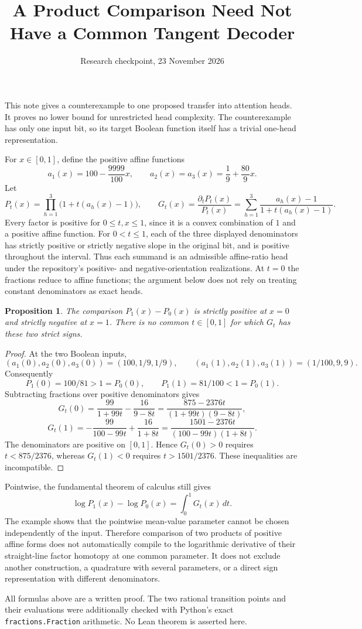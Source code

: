 \documentclass[11pt]{article}
\title{A Product Comparison Need Not Have a Common Tangent Decoder}
\author{Research checkpoint, 23 November 2026}
\date{}
\newtheorem{proposition}{Proposition}
\begin{document}
\maketitle

This note gives a counterexample to one proposed transfer into attention
heads. It proves no lower bound for unrestricted head complexity. The
counterexample has only one input bit, so its target Boolean function itself
has a trivial one-head representation.

For $x\in[0,1]$, define the positive affine functions
\[
 a_1(x)=100-\frac{9999}{100}x,
 \qquad
 a_2(x)=a_3(x)=\frac19+\frac{80}{9}x.
\]
Let
\[
 P_t(x)=\prod_{h=1}^3\bigl(1+t(a_h(x)-1)\bigr),
 \qquad
 G_t(x)=\frac{\partial_t P_t(x)}{P_t(x)}
 =\sum_{h=1}^3\frac{a_h(x)-1}{1+t(a_h(x)-1)}.
\]
Every factor is positive for $0\leq t,x\leq1$, since it is a convex
combination of $1$ and a positive affine function. For $0<t\leq1$,
each of the three displayed denominators has strictly positive or strictly
negative slope in the original bit, and is positive throughout the interval.
Thus each summand is an admissible affine-ratio head under the repository's
positive- and negative-orientation realizations. At $t=0$ the fractions
reduce to affine functions; the argument below does not rely on treating
constant denominators as exact heads.

\begin{proposition}
The comparison $P_1(x)-P_0(x)$ is strictly positive at $x=0$ and
strictly negative at $x=1$. There is no common $t\in[0,1]$ for which
$G_t$ has these two strict signs.
\end{proposition}
\begin{proof}
At the two Boolean inputs,
\[
 (a_1(0),a_2(0),a_3(0))=(100,1/9,1/9),\qquad
 (a_1(1),a_2(1),a_3(1))=(1/100,9,9).
\]
Consequently
\[
 P_1(0)=100/81>1=P_0(0),\qquad
 P_1(1)=81/100<1=P_0(1).
\]
Subtracting fractions over positive denominators gives
\[
 G_t(0)=\frac{99}{1+99t}-\frac{16}{9-8t}
       =\frac{875-2376t}{(1+99t)(9-8t)},
\]
\[
 G_t(1)=-\frac{99}{100-99t}+\frac{16}{1+8t}
       =\frac{1501-2376t}{(100-99t)(1+8t)}.
\]
The denominators are positive on $[0,1]$. Hence $G_t(0)>0$ requires
$t<875/2376$, whereas $G_t(1)<0$ requires $t>1501/2376$.
These inequalities are incompatible.
\end{proof}

Pointwise, the fundamental theorem of calculus still gives
\[
 \log P_1(x)-\log P_0(x)=\int_0^1G_t(x)\,dt.
\]
The example shows that the pointwise mean-value parameter cannot be
chosen independently of the input. Therefore comparison of two products
of positive affine forms does not automatically compile to the logarithmic
derivative of their straight-line factor homotopy at one common parameter.
It does not exclude another construction, a quadrature with several
parameters, or a direct sign representation with different denominators.

All formulas above are a written proof. The two rational transition points
and their evaluations were additionally checked with Python's exact
\texttt{fractions.Fraction} arithmetic. No Lean theorem is asserted here.
\end{document}
